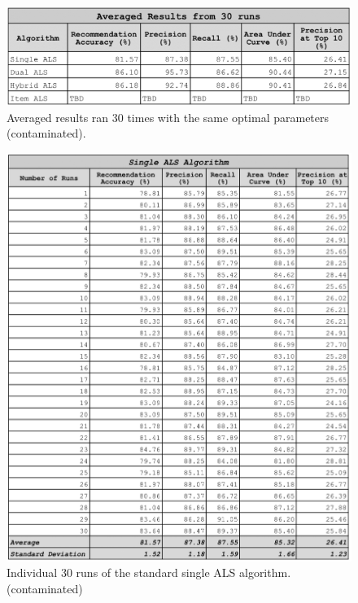 \begin{figure}
\centering
\includegraphics[scale=0.4]{images/results_tuning.png}
\caption{Averaged results ran 30 times with the same optimal parameters (contaminated).}
\label{fig:results}
\end{figure}

\begin{figure}
\centering
\includegraphics[scale=0.3]{images/single_als_30_runs.png}
\caption{Individual 30 runs of the standard single ALS algorithm. (contaminated)}
\label{fig:single_algorithm}
\end{figure}

